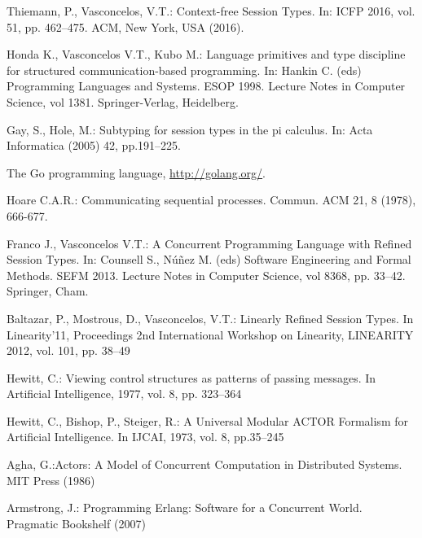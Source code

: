 
\begin{thebibliography}{8}

  Thiemann, P., Vasconcelos, V.T.: Context-free Session Types. In: ICFP 2016, vol. 51, pp. 462--475. ACM, New York, USA (2016). 

  Honda K., Vasconcelos V.T., Kubo M.: Language primitives and type discipline for structured communication-based programming. In: Hankin C. (eds) Programming Languages and Systems. ESOP 1998. Lecture Notes in Computer Science, vol 1381. Springer-Verlag, Heidelberg. 

  Gay, S., Hole, M.: Subtyping for session types in the pi calculus. In: Acta Informatica (2005)
  42, pp.191–225. 

  The Go programming language, \url{http://golang.org/}.

  Hoare C.A.R.: Communicating sequential processes. Commun. ACM 21, 8 (1978), 666-677. 
  
    Franco J., Vasconcelos V.T.: A Concurrent Programming Language with Refined Session Types. In: Counsell S., Núñez M. (eds) Software Engineering and Formal Methods. SEFM 2013. Lecture Notes in Computer Science, vol 8368, pp. 33--42. Springer, Cham. 

  Baltazar, P., Mostrous, D., Vasconcelos, V.T.: Linearly Refined Session Types. In Linearity'11, Proceedings 2nd International Workshop on Linearity, {LINEARITY} 2012, vol. 101, pp. 38--49
  
   Hewitt, C.: Viewing control structures as patterns of passing messages. In Artificial Intelligence, 1977, vol. 8, pp. 323--364

   Hewitt, C., Bishop, P., Steiger, R.: A Universal Modular ACTOR Formalism for Artificial Intelligence. In IJCAI, 1973, vol. 8, pp.35--245

  
Agha, G.:Actors: A Model of Concurrent Computation in Distributed Systems. MIT Press (1986)
  
Armstrong, J.: Programming Erlang: Software for a Concurrent World. Pragmatic Bookshelf (2007)


\end{thebibliography}
